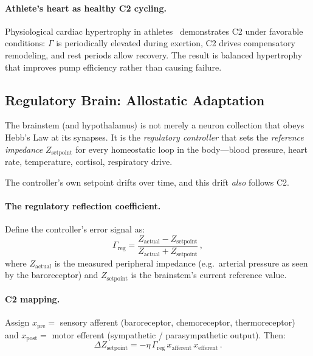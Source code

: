 \documentclass[aps,pre,twocolumn,superscriptaddress,floatfix]{revtex4-2}
\begin{document}
\paragraph{Athlete's heart as healthy C2 cycling.}
Physiological cardiac hypertrophy in
athletes~\cite{Maron2006} demonstrates C2 under
favorable conditions: $\Gamma$ is periodically
elevated during exertion, C2 drives compensatory
remodeling, and rest periods allow recovery.
The result is balanced hypertrophy that improves
pump efficiency rather than causing failure.


\subsection{Regulatory Brain: Allostatic Adaptation}
\label{sec:regulatory-brain}

The brainstem (and hypothalamus) is not merely a neuron
collection that obeys Hebb's Law at its synapses.
It is the \emph{regulatory controller}
that sets the \emph{reference impedance}
$Z_{\text{setpoint}}$ for every homeostatic loop in
the body---blood pressure, heart rate, temperature,
cortisol, respiratory drive.

The controller's own setpoint drifts over time, and
this drift \emph{also} follows C2.

\paragraph{The regulatory reflection coefficient.}
Define the controller's error signal as:
\begin{equation}
  \Gamma_{\text{reg}} =
  \frac{Z_{\text{actual}} - Z_{\text{setpoint}}}
       {Z_{\text{actual}} + Z_{\text{setpoint}}}\,,
  \label{eq:gamma-reg}
\end{equation}
where $Z_{\text{actual}}$ is the measured peripheral
impedance (e.g.\ arterial pressure as seen by the
baroreceptor) and $Z_{\text{setpoint}}$ is the
brainstem's current reference value.

\paragraph{C2 mapping.}
Assign $x_{\text{pre}} = $ sensory afferent
(baroreceptor, chemoreceptor, thermoreceptor)
and $x_{\text{post}} = $ motor efferent
(sympathetic / parasympathetic output).  Then:
\begin{equation}
  \Delta Z_{\text{setpoint}} =
  -\eta\,\Gamma_{\text{reg}}\,
  x_{\text{afferent}}\,x_{\text{efferent}}\,.
  \label{eq:c2-regulatory}
\end{equation}
\end{document}
